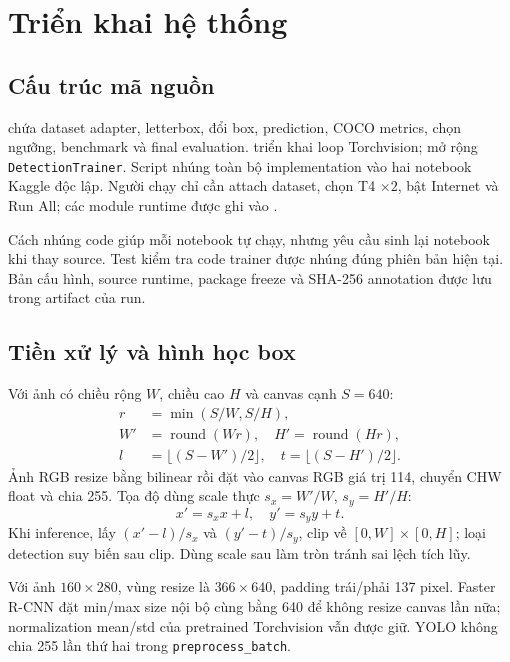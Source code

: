 \documentclass[a4paper,10pt,twocolumn]{article}
\newcommand{\FR}{Faster R-CNN}
\begin{document}
\section{Triển khai hệ thống}
\subsection{Cấu trúc mã nguồn}
 chứa dataset adapter, letterbox, đổi box, prediction,
COCO metrics, chọn ngưỡng, benchmark và final evaluation.
 triển khai loop Torchvision;
 mở rộng \texttt{DetectionTrainer}.
Script  nhúng toàn bộ implementation vào hai
notebook Kaggle độc lập. Người chạy chỉ cần attach dataset, chọn T4 $\times2$, bật
Internet và Run All; các module runtime được ghi vào .

Cách nhúng code giúp mỗi notebook tự chạy, nhưng yêu cầu sinh lại notebook khi thay
source. Test kiểm tra code trainer được nhúng đúng phiên bản hiện tại. Bản cấu hình,
source runtime, package freeze và SHA-256 annotation được lưu trong artifact của run.

\subsection{Tiền xử lý và hình học box}
Với ảnh có chiều rộng $W$, chiều cao $H$ và canvas cạnh $S=640$:
\begin{align}
 r&=\min(S/W,S/H),\\
 W'&=\operatorname{round}(Wr),\quad H'=\operatorname{round}(Hr),\\
 l&=\lfloor(S-W')/2\rfloor,\quad t=\lfloor(S-H')/2\rfloor.
\end{align}
Ảnh RGB resize bằng bilinear rồi đặt vào canvas RGB giá trị 114, chuyển CHW float
và chia 255. Tọa độ dùng scale thực $s_x=W'/W$, $s_y=H'/H$:
\begin{equation}
 x'=s_xx+l,\quad y'=s_yy+t.
\end{equation}
Khi inference, lấy $(x'-l)/s_x$ và $(y'-t)/s_y$, clip về $[0,W]\times[0,H]$;
loại detection suy biến sau clip. Dùng scale sau làm tròn tránh sai lệch tích lũy.

Với ảnh $160\times280$, vùng resize là $366\times640$, padding trái/phải 137 pixel.
\FR{} đặt min/max size nội bộ cùng bằng 640 để không resize canvas lần nữa;
normalization mean/std của pretrained Torchvision vẫn được giữ.
YOLO không chia 255 lần thứ hai trong \texttt{preprocess\_batch}.
\end{document}
